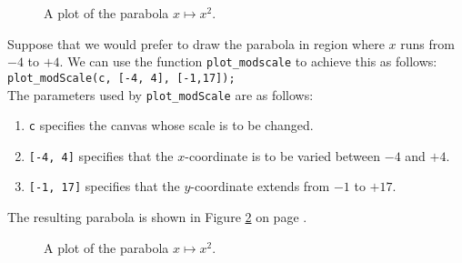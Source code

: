 \begin{figure}[!ht]
  \centering
  \caption{A plot of the parabola $x \mapsto x^2$.}
  \label{fig:parabola1.eps}
\end{figure}

Suppose that we would prefer to draw the parabola in region where $x$ runs from $-4$ to $+4$.
We can use the function \texttt{plot\_modscale} to achieve this as follows:
\\[0.2cm]
\hspace*{1.3cm}
\texttt{plot\_modScale(c, [-4, 4], [-1,17]);}
\\[0.2cm]
The parameters used by \texttt{plot\_modScale} are as follows:
\begin{enumerate}
\item \texttt{c} specifies the canvas whose scale is to be changed.
\item \texttt{[-4, 4]} specifies that the $x$-coordinate is to be varied between $-4$ and $+4$.
\item \texttt{[-1, 17]} specifies that the $y$-coordinate extends from $-1$ to $+17$.
\end{enumerate}
The resulting parabola is shown in Figure \ref{fig:parabola2.eps} on page \pageref{fig:parabola2.eps}.

\begin{figure}[!ht]
  \centering
  \caption{A plot of the parabola $x \mapsto x^2$.}
  \label{fig:parabola2.eps}
\end{figure}

